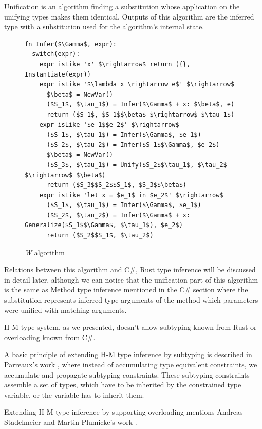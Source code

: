 Unification is an algorithm finding a substitution whose application on the unifying types makes them identical. 
Outputs of this algorithm are the inferred type with a substitution used for the algorithm's internal state. 
\par
\begin{figure}
\begin{lstlisting}[style=myAlgo, mathescape=true]
fn Infer($\Gamma$, expr):
  switch(expr):
    expr isLike 'x' $\rightarrow$ return ({}, Instantiate(expr))
    expr isLike '$\lambda x \rightarrow e$' $\rightarrow$
      $\beta$ = NewVar()
      ($S_1$, $\tau_1$) = Infer($\Gamma$ + x: $\beta$, e)
      return ($S_1$, $S_1$$\beta$ $\rightarrow$ $\tau_1$)
    expr isLike '$e_1$$e_2$' $\rightarrow$
      ($S_1$, $\tau_1$) = Infer($\Gamma$, $e_1$)
      ($S_2$, $\tau_2$) = Infer($S_1$$\Gamma$, $e_2$)
      $\beta$ = NewVar()
      ($S_3$, $\tau_1$) = Unify($S_2$$\tau_1$, $\tau_2$ $\rightarrow$ $\beta$)
      return ($S_3$$S_2$$S_1$, $S_3$$\beta$)
    expr isLike 'let x = $e_1$ in $e_2$' $\rightarrow$
      ($S_1$, $\tau_1$) = Infer($\Gamma$, $e_1$)
      ($S_2$, $\tau_2$) = Infer($\Gamma$ + x: Generalize($S_1$$\Gamma$, $\tau_1$), $e_2$)
      return ($S_2$$S_1$, $\tau_2$)
\end{lstlisting}
\caption{\textit{W} algorithm}
\label{img74:w}
\end{figure}
\par
{}
Relations between this algorithm and C\#, Rust type inference will be discussed in detail later, although we can notice that the unification part of this algorithm is the same as Method type inference mentioned in the C\# section where the substitution represents inferred type arguments of the method which parameters were unified with matching arguments.
\par
{}
H-M type system, as we presented, doesn't allow subtyping known from Rust or overloading known from C\#.  
\par
A basic principle of extending H-M type inference by subtyping is described in Parreaux's work \cite{paper:Parreaux}, where instead of accumulating type equivalent constraints, we accumulate and propagate subtyping constraints.
These subtyping constraints assemble a set of types, which have to be inherited by the constrained type variable, or the variable has to inherit them.
\par
{}
Extending H-M type inference by supporting overloading mentions Andreas Stadelmeier and Martin Plumicke's work \cite{paper:Overloading}.
